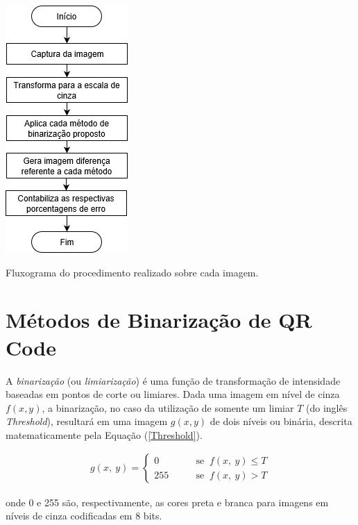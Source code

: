 \documentclass{ceel}
\begin{document}
\begin{multicols}{2}
\vspace{0.5cm}
\begin{minipage}[h]{\columnwidth}
\centering
\captionsetup{type=figure}
\includegraphics[scale=0.58]{Fluxograma}
\caption{Fluxograma do procedimento realizado sobre cada imagem.} \label{fluxograma}
\end{minipage}
\columnbreak

\section{Métodos de Binarização de QR Code} \label{metodos}
A \emph{binarização} (ou \emph{limiarização}) é uma função de transformação de intensidade baseadas em pontos de corte ou limiares. Dada uma imagem em nível de cinza $f(x, y)$, a binarização, no caso da utilização de somente um limiar $T$ (do inglês \emph{Threshold}), resultará em uma imagem $g(x, y)$  de dois níveis ou binária, descrita matematicamente pela Equação (\ref{Threshold}).

\begin{gather}
g( x,\ y) =\begin{cases}
0 & \quad \quad \text{se }\ f( x,\ y) \leqslant T\\
255 & \quad \quad \text{se }\ f( x,\ y)  >T
\end{cases}
\label{Threshold}
\end{gather}

\noindent onde 0 e 255 são, respectivamente, as cores preta e branca para imagens em níveis de cinza codificadas em 8 bits.\\


\end{multicols}
\end{document}
